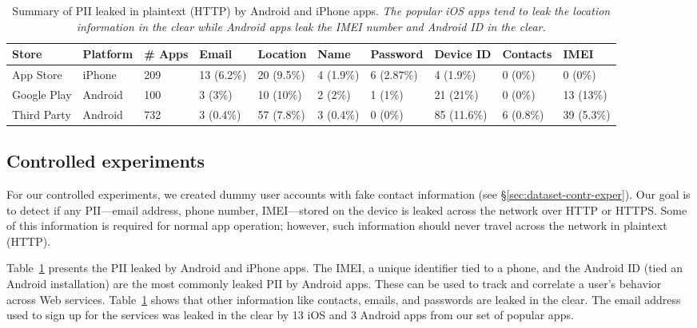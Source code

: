 \begin{table}[t]    
    \centering
    \begin{small}
    \begin{tabular}{|l|l|l|l|l|l|l|l|l|l|}
       \hline
       {\bf Store}&{\bf Platform}&{\bf \# Apps}&{\bf Email}& {\bf Location}& {\bf Name} &{\bf Password}& {\bf Device ID}& {\bf Contacts}& {\bf IMEI}\\
       \hline
       App Store&iPhone&209&13 (6.2\%) &20 (9.5\%)&4 (1.9\%)&6 (2.87\%)&4 (1.9\%)&0 (0\%)&0 (0\%)\\
       \hline
       Google Play&Android&100&3 (3\%)&10 (10\%)&2 (2\%)&1 (1\%)&21 (21\%)&0 (0\%)&13 (13\%)\\
       \hline
Third Party&Android&732&3 (0.4\%)&57 (7.8\%)&3 (0.4\%)&0 (0\%)&85 (11.6\%)&6 (0.8\%)&39 (5.3\%)\\
       \hline
    \end{tabular}
    \end{small}
    \caption{Summary of PII leaked in plaintext (HTTP) by Android and iPhone apps. \emph{The popular iOS apps tend to leak the location information in the clear while Android apps leak the IMEI number and Android ID in the clear. }}
    \vspace{\postfigspace}
    \label{tab:pii}
\end{table}

\subsection{Controlled experiments}

For our controlled experiments, we created dummy user accounts with fake contact
information (see \S\ref{sec:dataset-contr-exper}).  Our goal is to
detect if any PII---email
address, phone number, IMEI---stored on the device is leaked
across the network over HTTP or HTTPS.
Some of this information is required for normal app operation; however, such information should
never travel across the network in plaintext (HTTP).  

 Table~\ref{tab:pii} presents the PII leaked by Android and iPhone apps. 
The IMEI, a unique identifier tied to a phone, and the Android ID (tied an Android installation) 
are the most commonly
leaked PII by Android apps.  These can be used to track
and correlate a user's behavior across Web services. Table~\ref{tab:pii} 
shows that other information like contacts, emails, and passwords
are leaked in the clear.  The email address used to sign
up for the services was leaked in the clear by 13 iOS and 3 Android
apps from our set of popular apps.

